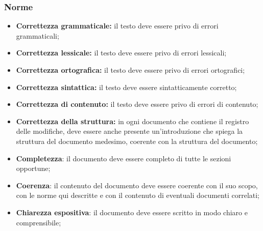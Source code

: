 \subsubsection*{Norme}
\begin{itemize}
	\item \textbf{Correttezza grammaticale:} il testo deve essere privo di errori grammaticali;
	\item \textbf{Correttezza lessicale:} il testo deve essere privo di errori lessicali;
	\item \textbf{Correttezza ortografica:} il testo deve essere privo di errori ortografici;
	\item \textbf{Correttezza sintattica:} il testo deve essere sintatticamente corretto;
	\item \textbf{Correttezza di contenuto:} il testo deve essere privo di errori di contenuto;
	\item \textbf{Correttezza della struttura:} in ogni documento che contiene il registro delle modifiche, deve essere anche presente un'introduzione che spiega la struttura del documento medesimo, coerente con la struttura del documento;
	\item \textbf{Completezza}: il documento deve essere completo di tutte le sezioni opportune;
	\item \textbf{Coerenza}: il contenuto del documento deve essere coerente con il suo scopo, con le norme qui descritte e con il contenuto di eventuali documenti correlati;
	\item \textbf{Chiarezza espositiva}: il documento deve essere scritto in modo chiaro e comprensibile;
\end{itemize}

